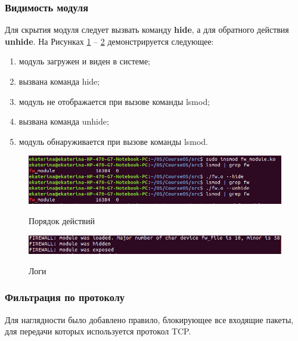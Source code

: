 \subsubsection{Видимость модуля}
Для скрытия модуля следует вызвать команду \textbf{hide}, а для обратного действия \textbf{unhide}. На Рисунках \ref{fig12:image} -- \ref{fig13:image} демонстрируется следующее:
\begin{enumerate}
	\item модуль загружен и виден в системе;
	
	\item вызвана команда hide;
	
	\item модуль не отображается при вызове команды lsmod;
	
	\item вызвана команда unhide;
	
	\item модуль обнаруживается при вызове команды lsmod.
\end{enumerate}

\begin{figure}[h]
	\begin{center}
		{\includegraphics[scale = 0.6]{img/screenshots/hide_unhide/hide_comm.png}}
		\caption{Порядок действий}
		\label{fig12:image}
	\end{center}
\end{figure}

\begin{figure}[h]
	\begin{center}
		{\includegraphics[scale = 0.7]{img/screenshots/hide_unhide/hide_result.png}}
		\caption{Логи}
		\label{fig13:image}
	\end{center}
\end{figure}

\subsubsection{Фильтрация по протоколу}
Для наглядности было добавлено правило, блокирующее все входящие пакеты, для передачи которых используется протокол TCP.

